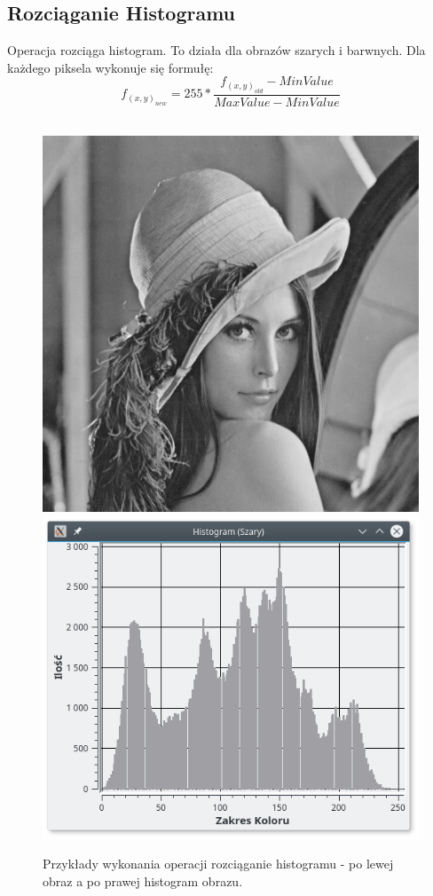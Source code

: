 \documentclass{article}
\begin{document}
\FloatBarrier
\subsection{Rozciąganie Histogramu}
Operacja rozciąga histogram.  To działa dla obrazów szarych i barwnych. Dla każdego piksela wykonuje się formułę:
\begin{equation*}
f_(x,y)_{new} = 255* \frac{f_(x,y)_{old}-MinValue}{MaxValue-MinValue}
\end{equation*}\\
\begin{figure}[!htb]
\centering
\includegraphics[scale=0.2]{img/lena_8bit.png}
\includegraphics[scale=0.3]{img/histogram-rozciaganie.png} 
\caption{Przykłady wykonania operacji rozciąganie histogramu - po lewej obraz a po prawej histogram obrazu. }
\end{figure}
\end{document}
